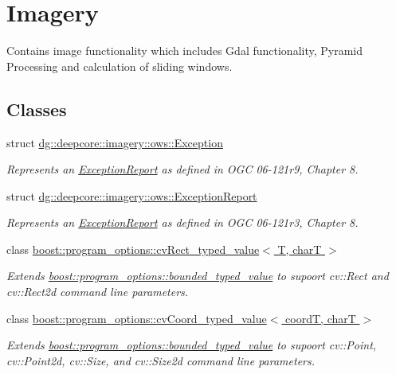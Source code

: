 \hypertarget{group___imagery_module}{}\section{Imagery}
\label{group___imagery_module}


Contains image functionality which includes Gdal functionality, Pyramid Processing and calculation of sliding windows.  


\subsection*{Classes}
\begin{DoxyCompactItemize}
\item 
struct \hyperlink{structdg_1_1deepcore_1_1imagery_1_1ows_1_1_exception}{dg\+::deepcore\+::imagery\+::ows\+::\+Exception}
\begin{DoxyCompactList}\small\item\em Represents an \hyperlink{structdg_1_1deepcore_1_1imagery_1_1ows_1_1_exception_report}{Exception\+Report} as defined in O\+GC 06-\/121r9, Chapter 8. \end{DoxyCompactList}\item 
struct \hyperlink{structdg_1_1deepcore_1_1imagery_1_1ows_1_1_exception_report}{dg\+::deepcore\+::imagery\+::ows\+::\+Exception\+Report}
\begin{DoxyCompactList}\small\item\em Represents an \hyperlink{structdg_1_1deepcore_1_1imagery_1_1ows_1_1_exception_report}{Exception\+Report} as defined in O\+GC 06-\/121r3, Chapter 8. \end{DoxyCompactList}\item 
class \hyperlink{structboost_1_1program__options_1_1cv_rect__typed__value}{boost\+::program\+\_\+options\+::cv\+Rect\+\_\+typed\+\_\+value$<$ T, char\+T $>$}
\begin{DoxyCompactList}\small\item\em Extends \hyperlink{classboost_1_1program__options_1_1bounded__typed__value}{boost\+::program\+\_\+options\+::bounded\+\_\+typed\+\_\+value} to supoort cv\+::\+Rect and cv\+::\+Rect2d command line parameters. \end{DoxyCompactList}\item 
class \hyperlink{structboost_1_1program__options_1_1cv_coord__typed__value}{boost\+::program\+\_\+options\+::cv\+Coord\+\_\+typed\+\_\+value$<$ coord\+T, char\+T $>$}
\begin{DoxyCompactList}\small\item\em Extends \hyperlink{classboost_1_1program__options_1_1bounded__typed__value}{boost\+::program\+\_\+options\+::bounded\+\_\+typed\+\_\+value} to supoort cv\+::\+Point, cv\+::\+Point2d, cv\+::\+Size, and cv\+::\+Size2d command line parameters. \end{DoxyCompactList}\item 

\end{DoxyCompactItemize}
